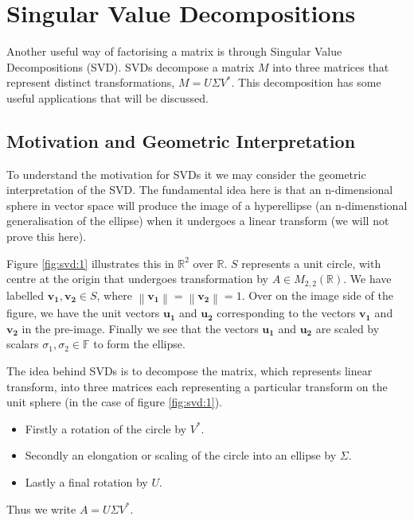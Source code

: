 \documentclass[12pt,reqno,twoside,titlepage]{article}
\newcommand{\norm}[1]{\left\lVert#1\right\rVert}
\theoremstyle{definition}
\theoremstyle{theorem}
\begin{document}
\section{Singular Value Decompositions}
\label{sec:svd}
Another useful way of factorising a matrix is through Singular Value Decompositions (SVD).
SVDs decompose a matrix $M$ into three matrices that represent distinct transformations, $M = U \Sigma V^*$.
This decomposition has some useful applications that will be discussed.

\subsection{Motivation and Geometric Interpretation}
\label{sec:svd:1}
To understand the motivation for SVDs it we may consider the geometric interpretation of the SVD.
The fundamental idea here is that an n-dimensional sphere in vector space will produce the image of a hyperellipse (an n-dimenstional generalisation of the ellipse) when it undergoes a linear transform (we will not prove this here).

Figure \ref{fig:svd:1} illustrates this in $\mathbb{R}^2$ over $\mathbb{R}$.
$S$ represents a unit circle, with centre at the origin that undergoes transformation by $A \in M_{2, 2}(\mathbb{R})$.
We have labelled $\mathbf{v_1}, \mathbf{v_2} \in S$, where $\norm{\mathbf{v_1}} = \norm{\mathbf{v_2}} = 1$.
Over on the image side of the figure, we have the unit vectors $\mathbf{u_1}$ and $\mathbf{u_2}$ corresponding to the vectors $\mathbf{v_1}$ and $\mathbf{v_2}$ in the pre-image.
Finally we see that the vectors $\mathbf{u_1}$ and $\mathbf{u_2}$ are scaled by scalars $\sigma_1, \sigma_2 \in \mathbb{F}$ to form the ellipse.


The idea behind SVDs is to decompose the matrix, which  represents linear transform, into three matrices each representing a particular transform on the unit sphere (in the case of figure \ref{fig:svd:1}).

\begin{itemize}
\item Firstly a rotation of the circle by $V^*$.
\item Secondly an elongation or scaling of the circle into an ellipse by $\Sigma$.
\item Lastly a final rotation by $U$.
\end{itemize}

Thus we write $A = U \Sigma V^*$.
\end{document}
